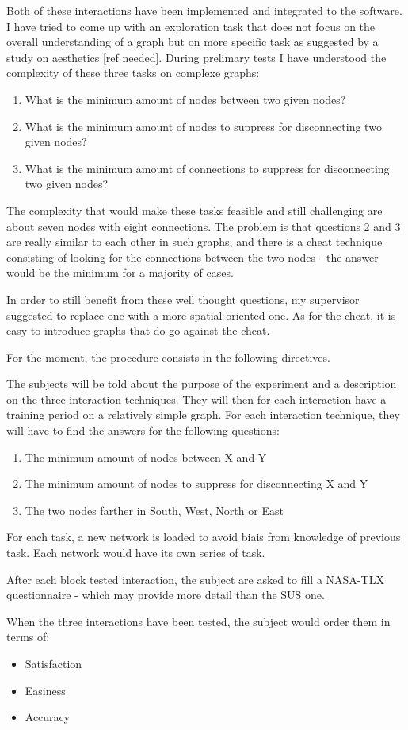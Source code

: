 Both of these interactions have been implemented and integrated to the software. I have tried to come up with an exploration task that does not focus on the overall understanding of a graph but on more specific task as suggested by a study on aesthetics [ref needed]. During prelimary tests I have understood the complexity of these three tasks on complexe graphs:

\begin{enumerate}
  \item What is the minimum amount of nodes between two given nodes?
  \item What is the minimum amount of nodes to suppress for disconnecting two given nodes?
  \item What is the minimum amount of connections to suppress for disconnecting two given nodes?
\end{enumerate}

The complexity that would make these tasks feasible and still challenging are about seven nodes with eight connections. The problem is that questions 2 and 3 are really similar to each other in such graphs, and there is a cheat technique consisting of looking for the connections between the two nodes - the answer would be the minimum for a majority of cases.

In order to still benefit from these well thought questions, my supervisor suggested to replace one with a more spatial oriented one. As for the cheat, it is easy to introduce graphs that do go against the cheat.

For the moment, the procedure consists in the following directives.

The subjects will be told about the purpose of the experiment and a description on the three interaction techniques. They will then for each interaction have a training period on a relatively simple graph. For each interaction technique, they will have to find the answers for the following questions:

\begin{enumerate}
  \item The minimum amount of nodes between X and Y
  \item The minimum amount of nodes to suppress for disconnecting X and Y
  \item The two nodes farther in South, West, North or East
\end{enumerate}

For each task, a new network is loaded to avoid biais from knowledge of previous task. Each network would have its own series of task. 

After each block tested interaction, the subject are asked to fill a NASA-TLX questionnaire - which may provide more detail than the SUS one.

When the three interactions have been tested, the subject would order them in terms of:

\begin{itemize}
  \item Satisfaction
  \item Easiness
  \item Accuracy
\end{itemize}

